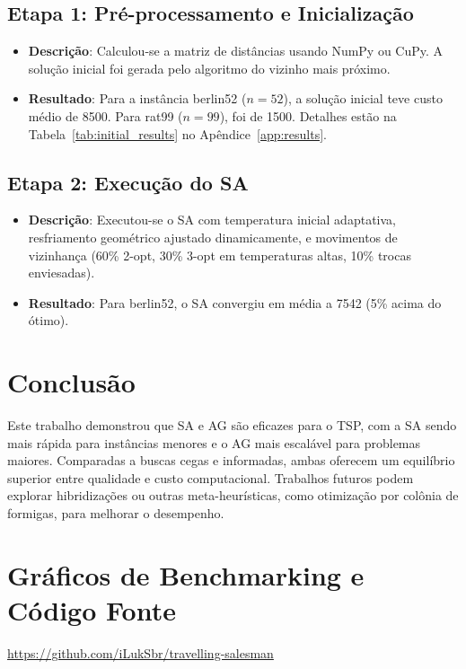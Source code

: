 \documentclass[12pt]{article}
\begin{document}
\subsection{Etapa 1: Pré-processamento e Inicialização}
\begin{itemize}
    \item \textbf{Descrição}: Calculou-se a matriz de distâncias usando NumPy ou CuPy. A solução inicial foi gerada pelo algoritmo do vizinho mais próximo.
    \item \textbf{Resultado}: Para a instância berlin52 (\(n=52\)), a solução inicial teve custo médio de 8500. Para rat99 (\(n=99\)), foi de 1500. Detalhes estão na Tabela~\ref{tab:initial_results} no Apêndice~\ref{app:results}.
\end{itemize}

\subsection{Etapa 2: Execução do SA}
\begin{itemize}
    \item \textbf{Descrição}: Executou-se o SA com temperatura inicial adaptativa, resfriamento geométrico ajustado dinamicamente, e movimentos de vizinhança (60\% 2-opt, 30\% 3-opt em temperaturas altas, 10\% trocas enviesadas).
    \item \textbf{Resultado}: Para berlin52, o SA convergiu em média a 7542 (5\% acima do ótimo).
\end{itemize}

\section{Conclusão}
Este trabalho demonstrou que SA e AG são eficazes para o TSP, com a SA sendo mais rápida para instâncias menores e o AG mais escalável para problemas maiores. Comparadas a buscas cegas e informadas, ambas oferecem um equilíbrio superior entre qualidade e custo computacional. Trabalhos futuros podem explorar hibridizações ou outras meta-heurísticas, como otimização por colônia de formigas, para melhorar o desempenho.




\appendix

\section{Gráficos de Benchmarking e Código Fonte}\label{app:code}
\href{https://github.com/iLukSbr/travelling-salesman}{https://github.com/iLukSbr/travelling-salesman}
\end{document}
